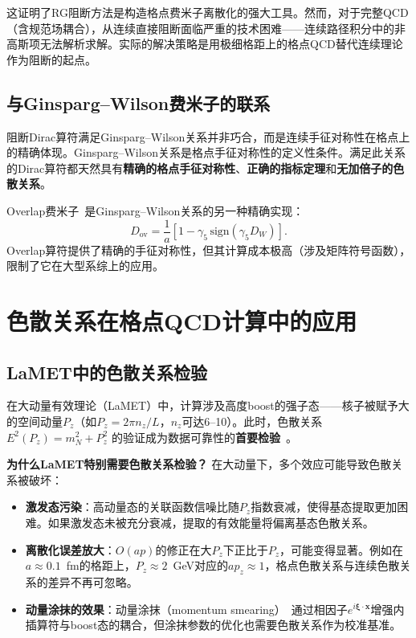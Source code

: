 \documentclass[12pt,a4paper]{ctexart}
\theoremstyle{definition}
\begin{document}
这证明了RG阻断方法是构造格点费米子离散化的强大工具。然而，对于完整QCD（含规范场耦合），从连续直接阻断面临严重的技术困难——连续路径积分中的非高斯项无法解析求解。实际的解决策略是用极细格距上的格点QCD替代连续理论作为阻断的起点。

\subsection{与Ginsparg--Wilson费米子的联系}

阻断Dirac算符满足Ginsparg--Wilson关系并非巧合，而是连续手征对称性在格点上的精确体现。Ginsparg--Wilson关系是格点手征对称性的定义性条件。满足此关系的Dirac算符都天然具有\textbf{精确的格点手征对称性}、\textbf{正确的指标定理}和\textbf{无加倍子的色散关系}。

Overlap费米子~\cite{GattringerLang2010}是Ginsparg--Wilson关系的另一种精确实现：
\begin{equation}
    D_{\text{ov}} = \frac{1}{a}\left[1 - \gamma_5\,\text{sign}(\gamma_5 D_W)\right].
\end{equation}
Overlap算符提供了精确的手征对称性，但其计算成本极高（涉及矩阵符号函数），限制了它在大型系综上的应用。

\section{色散关系在格点QCD计算中的应用}

\subsection{LaMET中的色散关系检验}

在大动量有效理论（LaMET）中，计算涉及高度boost的强子态——核子被赋予大的空间动量$P_z$（如$P_z = 2\pi n_z / L$，$n_z$可达6--10）。此时，色散关系 $E^2(P_z) = m_N^2 + P_z^2$ 的验证成为数据可靠性的\textbf{首要检验}~\cite{hadronSpectroscopy2026}。

\textbf{为什么LaMET特别需要色散关系检验？} 在大动量下，多个效应可能导致色散关系被破坏：
\begin{itemize}
    \item \textbf{激发态污染}：高动量态的关联函数信噪比随$P_z$指数衰减，使得基态提取更加困难。如果激发态未被充分衰减，提取的有效能量将偏离基态色散关系。
    \item \textbf{离散化误差放大}：$O(ap)$的修正在大$P_z$下正比于$P_z$，可能变得显著。例如在$a \approx 0.1$~fm的格距上，$P_z \approx 2$~GeV对应的$ap_z \approx 1$，格点色散关系与连续色散关系的差异不再可忽略。
    \item \textbf{动量涂抹的效果}：动量涂抹（momentum smearing）~\cite{KinematicallyEnhanced2015}通过相因子$e^{i\boldsymbol{\xi}\cdot\mathbf{x}}$增强内插算符与boost态的耦合，但涂抹参数的优化也需要色散关系作为校准基准。
\end{itemize}
\end{document}
